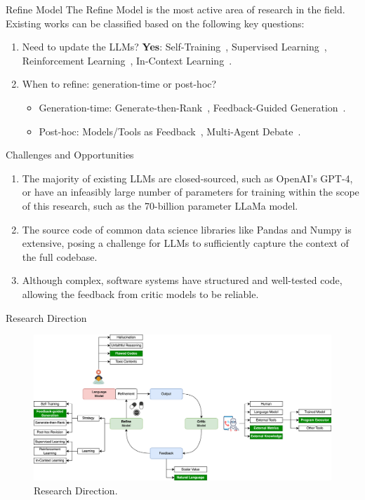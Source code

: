 \begin{frame}{Refine Model}
    The Refine Model is the most active area of research in the field. Existing works can be classified based on the following key questions:
    \begin{enumerate}
        \item Need to update the LLMs? \textbf{Yes}: Self-Training~\cite{huang2022large}, Supervised Learning~\cite{bai2022training}, Reinforcement Learning~\cite{dubois2024alpacafarm}, In-Context Learning~\cite{dong2022survey}.

        \item When to refine: generation-time or post-hoc?
              \begin{itemize}
                  \item Generation-time: Generate-then-Rank~\cite{cobbe2021training}, Feedback-Guided Generation~\cite{yao2023tree}.
                  \item Post-hoc: Models/Tools as Feedback~\cite{zhang2023selfedit}, Multi-Agent Debate~\cite{du2023improving}.
              \end{itemize}
    \end{enumerate}
\end{frame}

\begin{frame}{Challenges and Opportunities}
    \begin{enumerate}
        \item The majority of existing LLMs are closed-sourced, such as OpenAI's GPT-4, or have an infeasibly large number of parameters for training within the scope of this research, such as the 70-billion parameter LLaMa model.

        \item The source code of common data science libraries like Pandas and Numpy is extensive, posing a challenge for LLMs to sufficiently capture the context of the full codebase.

        \item Although complex, software systems have structured and well-tested code, allowing the feedback from critic models to be reliable.
    \end{enumerate}
\end{frame}

\begin{frame}{Research Direction}
    \begin{figure}[!htb]
        \centering
        \includegraphics[width=1\textwidth]{img/direction_of_research}
        \captionsetup{font=small,labelformat=empty}
        \caption{Research Direction.}
    \end{figure}
\end{frame}
